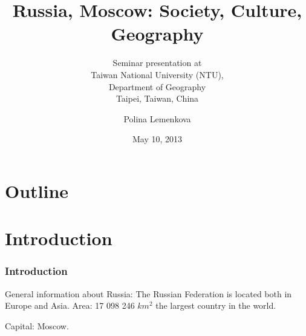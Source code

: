 \documentclass[pdflatex,compress,8pt,
	xcolor={dvipsnames,dvipsnames,svgnames,x11names,table},
	hyperref={colorlinks = true,breaklinks = true, urlcolor = NavyBlue, breaklinks = true}]{beamer}
\title[Russia, Moscow: Society, Culture, Geography]{Russia, Moscow: Society, Culture, Geography}
\subtitle{\vspace*{0.5cm}Seminar presentation at \\
Taiwan National University (NTU), \\
Department of Geography\\
Taipei, Taiwan, China}
\author{Polina Lemenkova}
\date{May 10, 2013}
\begin{document}
\begin{frame}
           \titlepage
\end{frame}

\section*{Outline}
 \begin{frame}
           \tableofcontents
\end{frame}

\section{Introduction}
\begin{frame}\frametitle{Introduction}
General information about Russia:
The Russian Federation is located both in Europe and Asia.
Area: 17 098 246 $km^{2}$ the largest country in the world.
\begin{figure}[H]
	\centering
			\hspace{5mm}
\end{figure}
Capital: Moscow.
\end{frame}
\end{document}
